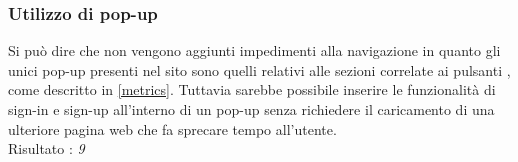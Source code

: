 \subsubsection{Utilizzo di pop-up}
Si può dire che non vengono aggiunti
impedimenti alla navigazione in quanto gli 
unici pop-up presenti nel sito sono quelli relativi alle sezioni 
correlate ai pulsanti , come descritto in
\ref{metrics}. Tuttavia sarebbe possibile inserire le funzionalità di
sign-in e sign-up all'interno di un pop-up senza richiedere il caricamento
di una ulteriore pagina web che fa sprecare tempo all'utente. \\
Risultato : \textit{9}

